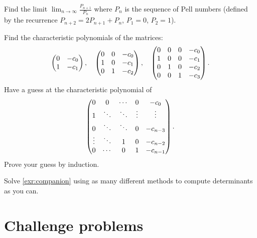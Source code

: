 \documentclass{article}
\begin{document}
\begin{Exercise}
Find the limit \(\lim_{n\to\infty}\frac{P_{n+1}}{P_n}\) where
\(P_n\) is the sequence of Pell numbers (defined by the recurrence
\(P_{n+2}=2P_{n+1}+P_n\), \(P_1=0\), \(P_2=1\)).




\end{Exercise}
\begin{Exercise}\label{exr:companion}
Find the characteristic polynomials of the matrices: \[\begin{pmatrix} 0 & -c_0
\\ 1 & -c_1\end{pmatrix},\quad\begin{pmatrix} 0 & 0 & -c_0 \\ 1 & 0 & -c_1 \\ 0 & 1 &
-c_2\end{pmatrix},\quad\begin{pmatrix} 0 & 0 & 0 & -c_0 \\ 1 & 0 & 0 & -c_1 \\ 0 & 1 & 0 &
-c_2 \\ 0 & 0 & 1 & -c_3\end{pmatrix}.\] Have a guess at the characteristic
polynomial of
\[\begin{pmatrix} 0 & 0 & \cdots & 0 & -c_0 \\ 1 & \ddots & \ddots & \vdots &
\vdots\\ 0 & \ddots & \ddots & 0 & -c_{n-3} \\ \vdots & \ddots & 1 &
0 & -c_{n-2} \\ 0 & \cdots & 0 & 1 & -c_{n-1}\end{pmatrix}.\] Prove your
guess by induction.


\end{Exercise}
\begin{Exercise}\label{exr:companionrevisited}
Solve \cref{exr:companion} using as many different methods to
compute determinants as you can.




\end{Exercise}
\newpage


\section{Challenge problems}
\end{document}
